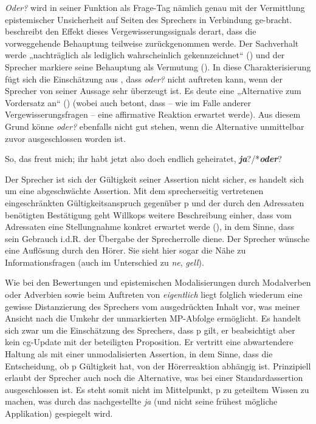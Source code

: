 \textit{Oder?} wird in seiner Funktion als Frage-Tag nämlich genau mit der Vermittlung epistemischer Unsicherheit auf Seiten des Sprechers in Verbindung ge-\linebreak bracht. \citet[273]{Willkop1988} beschreibt den Effekt dieses Vergewisserungssignals derart, dass die vorweggehende Behauptung teilweise zurückgenommen werde. Der Sachverhalt werde „nachträglich als lediglich wahrscheinlich gekennzeichnet“ (\citeyear[271]{Willkop1988}) und der Sprecher markiere seine Behauptung als Vermutung (\citeyear[272]{Willkop1988}). In diese Charakterisierung fügt sich die Einschätzung aus \citet[131]{Bublitz1978}, dass \textit{oder?} nicht auftreten kann, wenn der Sprecher von seiner Aussage sehr überzeugt ist. Es deute eine „Alternative zum Vordersatz an“ (\citeyear[126]{Bublitz1978}) (wobei \citealt[276]{Willkop1988} auch betont, dass – wie im Falle anderer Vergewisserungsfragen – eine affirmative Reaktion erwartet werde). Aus diesem Grund könne \textit{oder?} ebenfalls nicht gut stehen, wenn die Alternative unmittelbar zuvor ausgeschlossen worden ist.

\begin{exe}
	\ex\label{494} 
	So, das freut mich; ihr habt jetzt also doch endlich geheiratet, \textit{\textbf{ja}}?/*\textit{\textbf{oder}}?
	\newline
	\hbox{}\hfill\hbox{\citet[127]{Bublitz1978}}			
\end{exe}
Der Sprecher ist sich der Gültigkeit seiner Assertion nicht sicher, es handelt sich um eine  abgeschwächte Assertion. Mit dem sprecherseitig vertretenen einge\-schränkten Gültigkeitsanspruch gegenüber p und der durch den Adressaten benötigten Bestätigung geht Willkops weitere Beschreibung einher, dass vom Adressaten eine Stellungnahme konkret erwartet werde (\citeyear[272]{Willkop1988}), in dem Sinne, dass sein Gebrauch i.d.R. der Übergabe der Sprecherrolle diene. Der Sprecher wünsche eine Auflösung durch den Hörer. Sie sieht hier sogar die Nähe zu Informationsfragen (auch im Unterschied zu \textit{ne}, \textit{gell}).\largerpage

Wie bei den Bewertungen und epistemischen Modalisierungen durch Modalverben oder Adverbien sowie beim Auftreten von \textit{eigentlich} liegt folglich wiederum eine gewisse Distanzierung des Sprechers vom ausgedrückten Inhalt vor, was meiner Ansicht nach die Umkehr der unmarkierten MP-Abfolge ermöglicht. Es handelt sich zwar um die Einschätzung des Sprechers, dass p gilt, er beabsichtigt aber kein cg-Update mit der beteiligten Proposition. Er vertritt eine abwartendere Haltung als mit einer unmodalisierten Assertion, in dem Sinne, dass die Entscheidung, ob p Gültigkeit hat, von der Hörerreaktion abhängig ist. Prinzipiell erlaubt der Sprecher auch noch die Alternative, was bei einer Standardassertion ausgeschlossen ist. Es steht somit nicht im Mittelpunkt, p zu geteiltem Wissen zu machen, was durch das nachgestellte \textit{ja} (und nicht seine frühest mögliche Applikation) gespiegelt wird.


